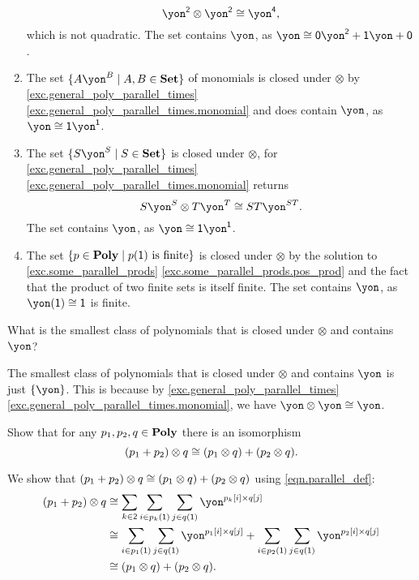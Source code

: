 \documentclass[Book-Poly]{subfiles}
\begin{document}
\begin{exercise}
\begin{solution}
\begin{enumerate}
	\[
	    \yon^\2 \otimes \yon^\2 \iso \yon^\4,
	\]
	which is not quadratic.
	The set contains $\yon$, as $\yon \iso \0\yon^\2 + \1\yon + \0$.
	\item The set $\{A\yon^B\mid A,B\in\smset\}$ of monomials is closed under $\otimes$ by \cref{exc.general_poly_parallel_times} \cref{exc.general_poly_parallel_times.monomial} and does contain $\yon$, as $\yon \iso \1\yon^\1$.
	\item The set $\{S\yon^S\mid S\in\smset\}$ is closed under $\otimes$, for \cref{exc.general_poly_parallel_times} \cref{exc.general_poly_parallel_times.monomial} returns
	\[
	    S\yon^S \otimes T\yon^T \iso ST\yon^{ST}.
	\]
	The set contains $\yon$, as $\yon \iso \1\yon^\1$.
	\item The set $\{p\in\mathbf{Poly}\mid p(\textsf{1})\text{ is finite}\}$ is closed under $\otimes$ by the solution to \cref{exc.some_parallel_prods} \cref{exc.some_parallel_prods.pos_prod} and the fact that the product of two finite sets is itself finite.
	The set contains $\yon$, as $\yon(\1) \iso \1$ is finite.
\end{enumerate}
\end{solution}
\end{exercise}

\begin{exercise}
What is the smallest class of polynomials that is closed under $\otimes$ and contains $\yon$?
\begin{solution}
The smallest class of polynomials that is closed under $\otimes$ and contains $\yon$ is just $\{\yon\}$.
This is because by \cref{exc.general_poly_parallel_times} \cref{exc.general_poly_parallel_times.monomial}, we have $\yon \otimes \yon \iso \yon$.
\end{solution}
\end{exercise}


\begin{exercise}
Show that for any $p_1,p_2,q\in\mathbf{Poly}$ there is an isomorphism
\[
(p_1+p_2)\otimes q\cong (p_1\otimes q)+(p_2\otimes q).
\]
\begin{solution}
We show that $(p_1 + p_2) \otimes q \cong (p_1 \otimes q) + (p_2 \otimes q)$ using \eqref{eqn.parallel_def}:
\begin{align*}
    (p_1 + p_2) \otimes q &\iso \sum_{k \in \2} \sum_{i \in p_k(\1)} \sum_{j \in q(\1)} \yon^{p_k[i] \times q[j]} \\
    &\iso \sum_{i \in p_1(\1)} \sum_{j \in q(\1)} \yon^{p_1[i] \times q[j]} + \sum_{i \in p_2(\1)} \sum_{j \in q(\1)} \yon^{p_2[i] \times q[j]} \\
    &\iso (p_1 \otimes q) + (p_2 \otimes q).
\end{align*}
\end{solution}
\end{exercise}
\end{document}
